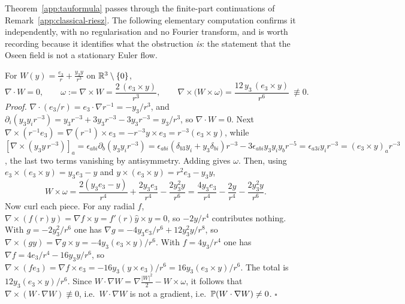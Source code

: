 \begin{remark}
\label{app:crosscheck}
Theorem~\ref{app:tauformula} passes through the finite-part
continuations of Remark~\ref{app:classical-riesz}. The following
elementary computation confirms it independently, with no
regularisation and no Fourier transform, and is worth recording because
it identifies what the obstruction \emph{is}: the statement that the
Oseen field is not a stationary Euler flow.

For $W(y)=\frac{e_3}{r}+\frac{y_3y}{r^{3}}$ on $\mathbb R^3\setminus\{0\}$,
\[
\nabla\cdot W=0,\qquad
\omega:=\nabla\times W=\frac{2\,(e_3\times y)}{r^{3}},\qquad
\nabla\times\big(W\times\omega\big)
=\frac{12\,y_3\,(e_3\times y)}{r^{6}}\ \not\equiv0 .
\]
\emph{Proof.} $\nabla\cdot(e_3/r)=e_3\cdot\nabla r^{-1}=-y_3/r^3$, and
$\partial_i(y_3y_ir^{-3})=y_3r^{-3}+3y_3r^{-3}-3y_3r^{-3}=y_3/r^3$, so
$\nabla\cdot W=0$. Next
$\nabla\times(r^{-1}e_3)=\nabla(r^{-1})\times e_3=-r^{-3}y\times e_3
=r^{-3}(e_3\times y)$, while
$[\nabla\times(y_3y\,r^{-3})]_a
=\epsilon_{abi}\partial_b(y_3y_ir^{-3})
=\epsilon_{abi}(\delta_{b3}y_i+y_3\delta_{bi})r^{-3}
-3\epsilon_{abi}y_3y_iy_br^{-5}
=\epsilon_{a3i}y_ir^{-3}=(e_3\times y)_ar^{-3}$, the last two terms
vanishing by antisymmetry. Adding gives $\omega$. Then, using
$e_3\times(e_3\times y)=y_3e_3-y$ and $y\times(e_3\times y)=r^2e_3-y_3y$,
\[
W\times\omega
=\frac{2(y_3e_3-y)}{r^{4}}+\frac{2y_3e_3}{r^{4}}-\frac{2y_3^{2}y}{r^{6}}
=\frac{4y_3e_3}{r^{4}}-\frac{2y}{r^{4}}-\frac{2y_3^{2}y}{r^{6}} .
\]
Now curl each piece. For any radial $f$, $\nabla\times(f(r)y)
=\nabla f\times y=f'(r)\hat y\times y=0$, so $-2y/r^4$ contributes
nothing. With $g=-2y_3^{2}/r^{6}$ one has
$\nabla g=-4y_3e_3/r^{6}+12y_3^{2}y/r^{8}$, so
$\nabla\times(gy)=\nabla g\times y=-4y_3(e_3\times y)/r^{6}$. With
$f=4y_3/r^{4}$ one has $\nabla f=4e_3/r^{4}-16y_3y/r^{6}$, so
$\nabla\times(fe_3)=\nabla f\times e_3
=-16y_3(y\times e_3)/r^{6}=16y_3(e_3\times y)/r^{6}$. The total is
$12y_3(e_3\times y)/r^{6}$. Since
$W\cdot\nabla W=\nabla\frac{|W|^2}{2}-W\times\omega$, it follows that
$\nabla\times(W\cdot\nabla W)\not\equiv0$, i.e.\ $W\cdot\nabla W$ is not
a gradient, i.e.\ $\mathbb P(W\cdot\nabla W)\neq0$. $\square$


\end{remark}

